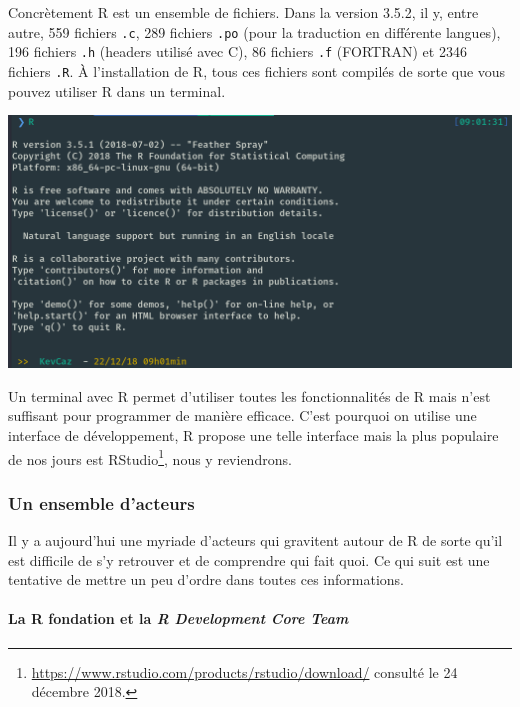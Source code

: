\documentclass[]{article}
\let\oldparagraph\paragraph
\renewcommand{\paragraph}[1]{\oldparagraph{#1}\mbox{}}
\begin{document}
Concrètement R est un ensemble de fichiers. Dans la version 3.5.2, il y, entre autre, 559 fichiers \texttt{.c}, 289 fichiers \texttt{.po} (pour la traduction en différente langues), 196 fichiers \texttt{.h} (headers utilisé avec C), 86 fichiers \texttt{.f} (FORTRAN) et 2346 fichiers \texttt{.R}. À l'installation de R, tous ces fichiers sont compilés de sorte que vous pouvez utiliser R dans un terminal.

\includegraphics{img/chap2/screenshotR.png}

Un terminal avec R permet d'utiliser toutes les fonctionnalités de R mais n'est suffisant pour programmer de manière efficace. C'est pourquoi on utilise une interface de développement, R propose une telle interface mais la plus populaire de nos jours est RStudio\footnote{\url{https://www.rstudio.com/products/rstudio/download/} consulté le 24 décembre 2018.}, nous y reviendrons.

\hypertarget{un-ensemble-dacteurs}{%
\subsubsection{Un ensemble d'acteurs}\label{un-ensemble-dacteurs}}

Il y a aujourd'hui une myriade d'acteurs qui gravitent autour de R de sorte qu'il est difficile de s'y retrouver et de comprendre qui fait quoi. Ce qui suit est une tentative de mettre un peu d'ordre dans toutes ces informations.

\hypertarget{la-r-fondation-et-la-r-development-core-team}{%
\paragraph{\texorpdfstring{La R fondation et la \emph{R Development Core Team}}{La R fondation et la R Development Core Team}}\label{la-r-fondation-et-la-r-development-core-team}}
\end{document}
